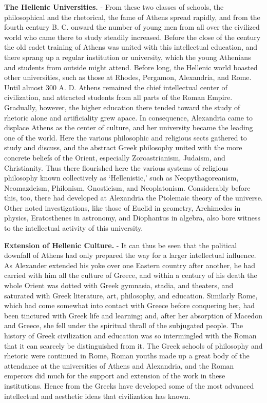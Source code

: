 \documentclass[]{book}
\begin{document}
\textbf{The Hellenic Universities.} - From these two classes of schools, the philosophical and the rhetorical, the fame of Athens spread rapidly, and from the fourth century B. C. onward the number of young men from all over the civilized world who came there to study steadily increased. Before the close of the century the old cadet training of Athens was united with this intellectual education, and there sprang up a regular institution or university, which the young Athenians and students from outside might attend. Before long, the Hellenic world boasted other universities, such as those at Rhodes, Pergamon, Alexandria, and Rome. Until almost 300 A. D. Athens remained the chief intellectual center of civilization, and attracted students from all parts of the Roman Empire. Gradually, however, the higher education there tended toward the study of rhetoric alone and artificiality grew apace. In consequence, Alexandria came to displace Athens as the center of culture, and her university became the leading one of the world. Here the various philosophic and religious sects gathered to study and discuss, and the abstract Greek philosophy united with the more concrete beliefs of the Orient, especially Zoroastrianism, Judaism, and Christianity. Thus there flourished here the various systems of religious philosophy known collectively as `Hellenistic,' such as Neopythagoreanism, Neomazdeism, Philonism, Gnosticism, and Neoplatonism. Considerably before this, too, there had developed at Alexandria the Ptolemaic theory of the universe. Other noted investigations, like those of Euclid in geometry, Archimedes in physics, Eratosthenes in astronomy, and Diophantus in algebra, also bore witness to the intellectual activity of this university.

\textbf{Extension of Hellenic Culture.} - It can thus be seen that the political downfall of Athens had only prepared the way for a larger intellectual influence. As Alexander extended his yoke over one Eastern country after another, he had carried with him all the culture of Greece, and within a century of his death the whole Orient was dotted with Greek gymnasia, stadia, and theaters, and saturated with Greek literature, art, philosophy, and education. Similarly Rome, which had come somewhat into contact with Greece before conquering her, had been tinctured with Greek life and learning; and, after her absorption of Macedon and Greece, she fell under the spiritual thrall of the subjugated people. The history of Greek civilization and education was so intermingled with the Roman that it can scarcely be distinguished from it. The Greek schools of philosophy and rhetoric were continued in Rome, Roman youths made up a great body of the attendance at the universities of Athens and Alexandria, and the Roman emperors did much for the support and extension of the work in these institutions. Hence from the Greeks have developed some of the most advanced intellectual and aesthetic ideas that civilization has known.
\end{document}
